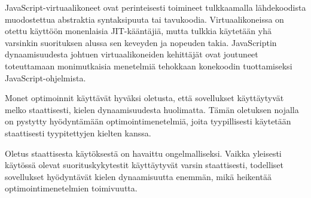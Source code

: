 JavaScript-virtuaalikoneet ovat perinteisesti toimineet tulkkaamalla lähdekoodista muodostettua abstraktia syntaksipuuta tai tavukoodia. Virtuaalikoneissa on otettu käyttöön monenlaisia JIT-kääntäjiä, mutta tulkkia käytetään yhä varsinkin suorituksen alussa sen keveyden ja nopeuden takia. JavaScriptin dynaamisuudesta johtuen virtuaalikoneiden kehittäjät ovat joutuneet toteuttamaan monimutkaisia menetelmiä tehokkaan konekoodin tuottamiseksi JavaScript-ohjelmista.

Monet optimoinnit käyttävät hyväksi oletusta, että sovellukset käyttäytyvät melko staattisesti, kielen dynaamisuudesta huolimatta. Tämän oletuksen nojalla on pystytty hyödyntämään optimointimenetelmiä, joita tyypillisesti käytetään staattisesti tyypitettyjen kielten kanssa.

Oletus staattisesta käytöksestä on havaittu ongelmalliseksi. Vaikka yleisesti käytössä olevat suorituskykytestit käyttäytyvät varsin staattisesti, todelliset sovellukset hyödyntävät kielen dynaamisuutta enemmän, mikä heikentää optimointimenetelmien toimivuutta.